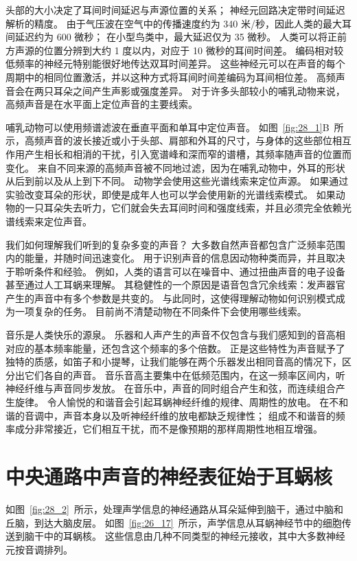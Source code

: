头部的大小决定了耳间时间延迟与声源位置的关系； 神经元回路决定带时间延迟解析的精度。
由于气压波在空气中的传播速度约为 340 米/秒，因此人类的最大耳间延迟约为 600 微秒；
在小型鸟类中，最大延迟仅为 35 微秒。
人类可以将正前方声源的位置分辨到大约 1 度以内，对应于 10 微秒的耳间时间差。
编码相对较低频率的神经元特别能很好地传达双耳时间差异。
这些神经元可以在声音的每个周期中的相同位置激活，并以这种方式将耳间时间差编码为耳间相位差。
高频声音会在两只耳朵之间产生声影或强度差异。
对于许多头部较小的哺乳动物来说，高频声音是在水平面上定位声音的主要线索。


哺乳动物可以使用频谱滤波在垂直平面和单耳中定位声音。
如图~\ref{fig:28_1}B~所示，高频声音的波长接近或小于头部、肩部和外耳的尺寸，与身体的这些部位相互作用产生相长和相消的干扰，引入宽谱峰和深而窄的谱槽，其频率随声音的位置而变化。
来自不同来源的高频声音被不同地过滤，因为在哺乳动物中，外耳的形状从后到前以及从上到下不同。
动物学会使用这些光谱线索来定位声源。
如果通过实验改变耳朵的形状，即使是成年人也可以学会使用新的光谱线索模式。
如果动物的一只耳朵失去听力，它们就会失去耳间时间和强度线索，并且必须完全依赖光谱线索来定位声音。


我们如何理解我们听到的复杂多变的声音？
大多数自然声音都包含广泛频率范围内的能量，并随时间迅速变化。
用于识别声音的信息因动物种类而异，并且取决于聆听条件和经验。
例如，人类的语言可以在噪音中、通过扭曲声音的电子设备甚至通过人工耳蜗来理解。
其稳健性的一个原因是语音包含冗余线索：发声器官产生的声音中有多个参数是共变的。
与此同时，这使得理解动物如何识别模式成为一项复杂的任务。
目前尚不清楚动物在不同条件下会使用哪些线索。


音乐是人类快乐的源泉。
乐器和人声产生的声音不仅包含与我们感知到的音高相对应的基本频率能量，还包含这个频率的多个倍数。
正是这些特性为声音赋予了独特的质感，如笛子和小提琴，让我们能够在两个乐器发出相同音高的情况下，区分出它们各自的声音。
音乐音高主要集中在低频范围内，在这一频率区间内，听神经纤维与声音同步发放。
在音乐中，声音的同时组合产生和弦，而连续组合产生旋律。
令人愉悦的和谐音会引起耳蜗神经纤维的规律、周期性的放电。
在不和谐的音调中，声音本身以及听神经纤维的放电都缺乏规律性；
组成不和谐音的频率成分非常接近，它们相互干扰，而不是像预期的那样周期性地相互增强。



\section{中央通路中声音的神经表征始于耳蜗核}

如图~\ref{fig:28_2}~所示，处理声学信息的神经通路从耳朵延伸到脑干，通过中脑和丘脑，到达大脑皮层。
如图~\ref{fig:26_17}~所示，声学信息从耳蜗神经节中的细胞传送到脑干中的耳蜗核。
这些信息由几种不同类型的神经元接收，其中大多数神经元按音调排列。



